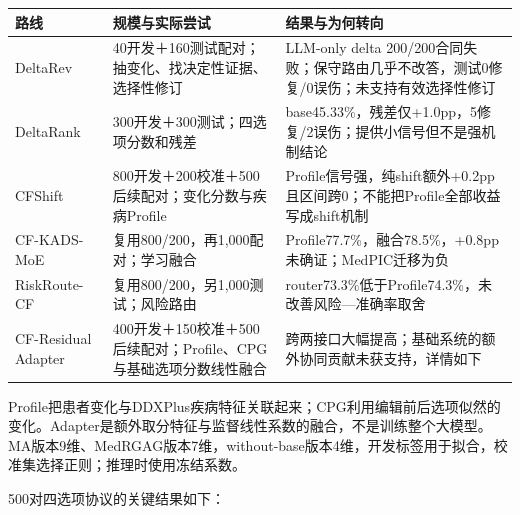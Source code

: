 \documentclass[
  11pt,
  a4paper,
]{article}
\newcounter{none} %
\begin{document}
{\def\LTcaptype{none} %
\begin{longtable}[]{@{}
  >{\raggedright\arraybackslash}p{}
  >{\raggedright\arraybackslash}p{}
  >{\raggedright\arraybackslash}p{}@{}}
\toprule\noalign{}
\begin{minipage}[b]{\linewidth}\raggedright
路线
\end{minipage} & \begin{minipage}[b]{\linewidth}\raggedright
规模与实际尝试
\end{minipage} & \begin{minipage}[b]{\linewidth}\raggedright
结果与为何转向
\end{minipage} \\
\midrule\noalign{}
\endhead
\bottomrule\noalign{}
\endlastfoot
DeltaRev & 40开发＋160测试配对；抽变化、找决定性证据、选择性修订 &
LLM-only delta
200/200合同失败；保守路由几乎不改答，测试0修复/0误伤；未支持有效选择性修订 \\
DeltaRank & 300开发＋300测试；四选项分数和残差 &
base45.33\%，残差仅+1.0pp，5修复/2误伤；提供小信号但不是强机制结论 \\
CFShift & 800开发＋200校准＋500后续配对；变化分数与疾病Profile &
Profile信号强，纯shift额外+0.2pp且区间跨0；不能把Profile全部收益写成shift机制 \\
CF-KADS-MoE & 复用800/200，再1,000配对；学习融合 &
Profile77.7\%，融合78.5\%，+0.8pp未确证；MedPIC迁移为负 \\
RiskRoute-CF & 复用800/200，另1,000测试；风险路由 &
router73.3\%低于Profile74.3\%，未改善风险---准确率取舍 \\
CF-Residual Adapter &
400开发＋150校准＋500后续配对；Profile、CPG与基础选项分数线性融合 &
跨两接口大幅提高；基础系统的额外协同贡献未获支持，详情如下 \\
\end{longtable}
}

Profile把患者变化与DDXPlus疾病特征关联起来；CPG利用编辑前后选项似然的变化。Adapter是额外取分特征与监督线性系数的融合，不是训练整个大模型。MA版本9维、MedRGAG版本7维，without-base版本4维，开发标签用于拟合，校准集选择正则；推理时使用冻结系数。

500对四选项协议的关键结果如下：
\end{document}
